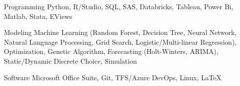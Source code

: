 


\begin{cvskills}


\cvskill
{Programming} %
{Python, R/Studio, SQL, SAS, Databricks, Tableau, Power Bi, Matlab, Stata, EViews} %


\cvskill
{Modeling} %
{Machine Learning (Random Forest, Decision Tree, Neural Network, Natural Language Processing, Grid Search, Logistic/Multi-linear Regression), Optimization, Genetic Algorithm, Forecasting (Holt-Winters, ARIMA), Static/Dynamic Discrete Choice, Simulation} %


\cvskill
{Software} %
{Microsoft Office Suite, Git, TFS/Azure DevOps, Linux, LaTeX} %


\end{cvskills}